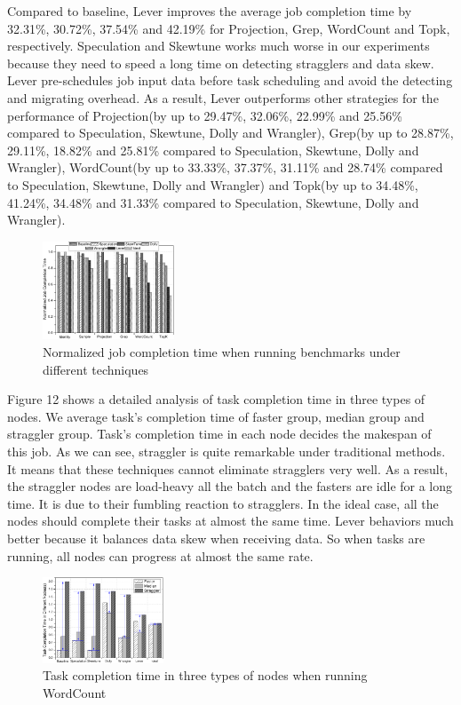 \documentclass[10pt,conference,compsocconf,letterpaper]{IEEEtran}
\begin{document}
  Compared to baseline, Lever improves the average job completion time by 32.31\%, 30.72\%, 37.54\% and 42.19\% for Projection, Grep, WordCount and Topk, respectively. Speculation and Skewtune works much worse in our experiments because they need to speed a long time on detecting stragglers and data skew. Lever pre-schedules job input data before task scheduling and avoid the detecting and migrating overhead. As a result, Lever outperforms other strategies for the performance of Projection(by up to 29.47\%, 32.06\%, 22.99\% and 25.56\% compared to Speculation, Skewtune, Dolly and Wrangler), Grep(by up to 28.87\%, 29.11\%, 18.82\% and 25.81\% compared to Speculation, Skewtune, Dolly and Wrangler), WordCount(by up to 33.33\%, 37.37\%, 31.11\% and 28.74\% compared to Speculation, Skewtune, Dolly and Wrangler) and Topk(by up to 34.48\%, 41.24\%, 34.48\% and 31.33\% compared to Speculation, Skewtune, Dolly and Wrangler).
  \begin{figure}[htbp]
    \centering
    \includegraphics[width=0.35\textwidth]{FigureJCT}
    \caption{Normalized job completion time when running benchmarks under different techniques}
    \label{Fig. 11:}
  \end{figure}

  Figure 12 shows a detailed analysis of task completion time in three types of nodes. We average task's completion time of faster group, median group and straggler group. Task's completion time in each node decides the makespan of this job. As we can see, straggler is quite remarkable under traditional methods. It means that these techniques cannot eliminate stragglers very well. As a result, the straggler nodes are load-heavy all the batch and the fasters are idle for a long time. It is due to their fumbling reaction to stragglers. In the ideal case, all the nodes should complete their tasks at almost the same time. Lever behaviors much better because it balances data skew when receiving data. So when tasks are running, all nodes can progress at almost the same rate.
  \begin{figure}[htbp]
    \centering
    \includegraphics[width=0.32\textwidth]{FigureMakeSpan}
    \caption{Task completion time in three types of nodes when running WordCount}
    \label{Fig. 12:}
  \end{figure}
\end{document}
